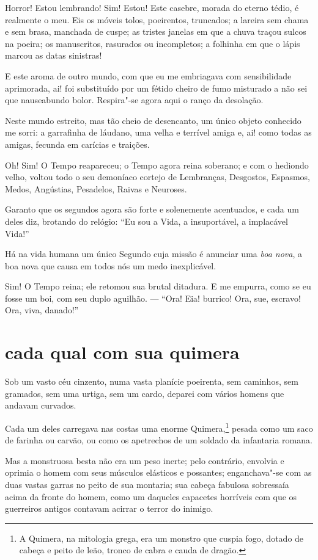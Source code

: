 Horror! Estou lembrando! Sim! Estou! Este casebre, morada do eterno
tédio, é realmente o meu. Eis os móveis tolos, poeirentos, truncados; a
lareira sem chama e sem brasa, manchada de cuspe; as tristes janelas em
que a chuva traçou sulcos na poeira; os manuscritos, rasurados ou
incompletos; a folhinha em que o lápis marcou as datas sinistras!

E este aroma de outro mundo, com que eu me embriagava com
sensibilidade aprimorada, ai! foi substituído por um fétido cheiro
de fumo misturado a não sei que nauseabundo bolor. Respira"-se agora
aqui o ranço da desolação.

Neste mundo estreito, mas tão cheio de desencanto, um único objeto conhecido
me sorri: a garrafinha de láudano, uma velha e terrível amiga e, ai!
como todas as amigas, fecunda em carícias e traições.

Oh! Sim! O Tempo reapareceu; o Tempo agora reina soberano; e com o
hediondo velho, voltou todo o seu demoníaco cortejo de Lembranças,
Desgostos, Espasmos, Medos, Angústias, Pesadelos, Raivas e Neuroses.

Garanto que os segundos agora são forte e solenemente acentuados, e
cada um deles diz, brotando do relógio: ``Eu sou a Vida, a
insuportável, a implacável Vida!''

Há na vida humana um único Segundo cuja missão é anunciar uma \textit{boa
nova}, a boa nova que causa em todos nós um medo inexplicável.

Sim! O Tempo reina; ele retomou sua brutal ditadura. E me empurra, como
se eu fosse um boi, com seu duplo aguilhão. --- ``Ora!
Eia! burrico! Ora, sue, escravo! Ora, viva, danado!''

\quebra\section[Cada qual com sua quimera]{cada qual com sua quimera}

Sob um vasto céu cinzento, numa vasta planície poeirenta, sem
caminhos, sem gramados, sem uma urtiga, sem um cardo, deparei com vários
homens que andavam curvados.

Cada um deles carregava nas costas uma enorme
Quimera,\protect\footnote{  A Quimera, na mitologia grega, era um monstro que cuspia fogo, dotado
de cabeça e peito de leão, tronco de cabra e cauda de dragão.} pesada como um saco de farinha ou
carvão, ou como os apetrechos de um soldado da infantaria romana.

Mas a monstruosa besta não era um peso inerte; pelo contrário, envolvia
e oprimia o homem com seus músculos elásticos e possantes;
enganchava"-se com as duas vastas garras no peito de sua montaria;
sua cabeça fabulosa sobressaía acima da fronte do homem, como um
daqueles capacetes horríveis com que os guerreiros antigos
contavam acirrar o terror do inimigo.

